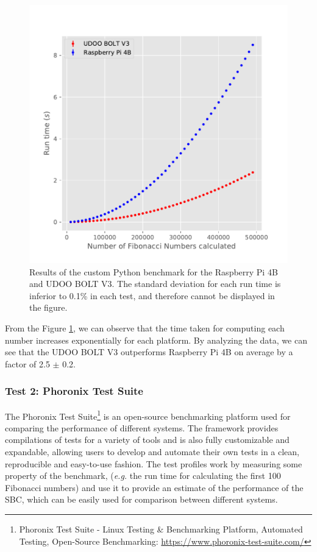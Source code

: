 \begin{figure}[H]
    \centering
    \includegraphics[width=0.8 \linewidth]{images/fibonacci-test.pdf}
    \caption [Results of the custom Python benchmark for the Raspberry Pi 4B and UDOO BOLT V3.]{ Results of the custom Python benchmark for the Raspberry Pi 4B and UDOO BOLT V3. The standard deviation for each run time is inferior to 0.1\% in each test, and therefore cannot be displayed in the figure.}
    \label{fig:fibonacci-tests}
\end{figure}

From the Figure \ref{fig:fibonacci-tests}, we can observe that the time taken for computing each number increases exponentially for each platform. By analyzing the data, we can see that the UDOO BOLT V3 outperforms Raspberry Pi 4B on average by a factor of 2.5 $\pm$ 0.2.

\subsubsection{Test 2: Phoronix Test Suite}

The Phoronix Test Suite\footnote{Phoronix Test Suite - Linux Testing \& Benchmarking Platform, Automated Testing, Open-Source Benchmarking: \url{https://www.phoronix-test-suite.com/}} is an open-source benchmarking platform used for comparing the performance of different systems. The framework provides compilations of tests for a variety of tools and is also fully customizable and expandable, allowing users to develop and automate their own tests in a clean, reproducible and easy-to-use fashion. The test profiles work by measuring some property of the benchmark, (\textit{e.g.} the run time for calculating the first 100 Fibonacci numbers) and use it to provide an estimate of the performance of the \acs{SBC}, which can be easily used for comparison between different systems. 

